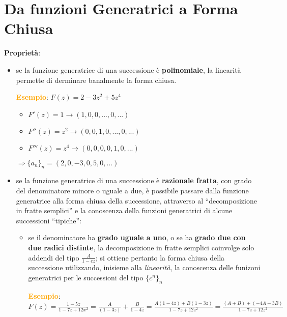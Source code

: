 \newpage
\section{Da funzioni Generatrici a Forma Chiusa}

\begin{flushleft}
    \textbf{Proprietà}:
    \begin{itemize}[nosep]
        \item se la funzione generatrice di una successione è \textbf{polinomiale}, la linearità permette di derminare banalmente la forma chiusa.
        \begin{boxA}
            \textcolor{orange}{\textbf{Esempio}}: $F(z) = 2 - 3z^2 + 5z^4$
            \begin{itemize}[nosep]
                \item $F'(z) = 1 \rightarrow (1, 0, 0, ..., 0, ...)$
                \item $F''(z) = z^2 \rightarrow (0, 0, 1, 0, ..., 0, ...)$
                \item $F'''(z) = z^4 \rightarrow (0, 0, 0, 0, 1, 0, ...)$
            \end{itemize}
            $\Rightarrow \{a_n\}_n = (2, 0, -3, 0, 5, 0, ...)$
        \end{boxA}
        \item se la funzione generatrice di una successione è \textbf{razionale fratta}, con grado del denominatore minore o uguale a due, è possibile passare dalla funzione generatrice alla forma chiusa della successione, attraverso al ``decomposizione in fratte semplici'' e la conoscenza della funzioni generatrici di alcune successioni ``tipiche'':
        \begin{itemize}[nosep]
            \item se il denominatore ha \textbf{grado uguale a uno}, o se ha \textbf{grado due con due radici distinte}, la decomposizione in fratte semplici coinvolge solo addendi del tipo $\frac{A}{1-cz}$; si ottiene pertanto la forma chiusa della successione utilizzando, inisieme alla \textit{linearità}, la conoscenza delle funizoni generatrici per le successioni del tipo $\{c^n\}_n$
            \begin{boxA}
                \textcolor{orange}{\textbf{Esempio}}: \\
                $F(z) = \frac{1-5z}{1-7z+12x^2} = \frac{A}{(1-3z)} + \frac{B}{1-4z} = \frac{A(1-4z)+B(1-3z)}{1-7z+12z^2} = \frac{(A+B) + (-4A-3B)}{1-7z+12z^2}$


\end{boxA}
\end{itemize}
\end{itemize}
\end{flushleft}
